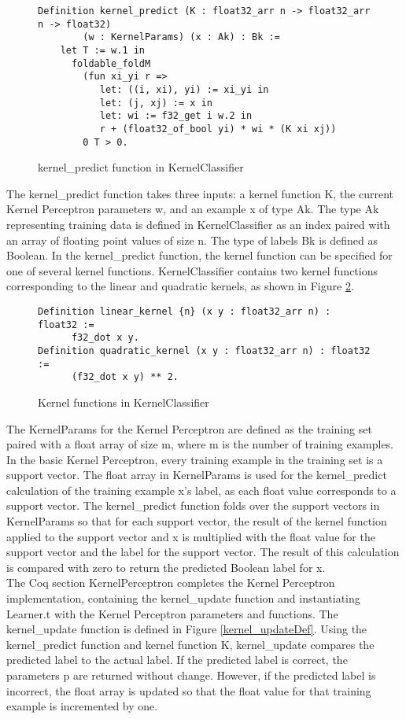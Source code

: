\begin{figure}
    \caption{kernel\_predict function in KernelClassifier}
    \label{kernel_predictDef}
    \begin{lstlisting}
Definition kernel_predict (K : float32_arr n -> float32_arr n -> float32) 
        (w : KernelParams) (x : Ak) : Bk :=
    let T := w.1 in 
      foldable_foldM
        (fun xi_yi r =>
           let: ((i, xi), yi) := xi_yi in
           let: (j, xj) := x in 
           let: wi := f32_get i w.2 in 
           r + (float32_of_bool yi) * wi * (K xi xj))
        0 T > 0.
    \end{lstlisting}
\end{figure}

The kernel\_predict function takes three inputs: a kernel function K, the current Kernel Perceptron parameters w, and an example x of type Ak. The type Ak representing training data is defined in KernelClassifier as an index paired with an array of floating point values of size n. The type of labels Bk is defined as Boolean. In the kernel\_predict function, the kernel function can be specified for one of several kernel functions. KernelClassifier contains two kernel functions corresponding to the linear and quadratic kernels, as shown in Figure \ref{kernelfunctionsDef}.

\begin{figure}
    \caption{Kernel functions in KernelClassifier}
    \label{kernelfunctionsDef}
    \begin{lstlisting}
Definition linear_kernel {n} (x y : float32_arr n) : float32 :=
      f32_dot x y.
Definition quadratic_kernel (x y : float32_arr n) : float32 :=
      (f32_dot x y) ** 2.
    \end{lstlisting}
\end{figure}

The KernelParams for the Kernel Perceptron are defined as the training set paired with a float array of size m, where m is the number of training examples. In the basic Kernel Perceptron, every training example in the training set is a support vector. The float array in KernelParams is used for the kernel\_predict calculation of the training example x's label, as each float value corresponds to a support vector. The kernel\_predict function folds over the support vectors in KernelParams so that for each support vector, the result of the kernel function applied to the support vector and x is multiplied with the float value for the support vector and the label for the support vector. The result of this calculation is compared with zero to return the predicted Boolean label for x. 
\\The Coq section KernelPerceptron completes the Kernel Perceptron implementation, containing the kernel\_update function and instantiating Learner.t with the Kernel Perceptron parameters and functions. The kernel\_update function is defined in Figure \ref{kernel_updateDef}. Using the kernel\_predict function and kernel function K, kernel\_update compares the predicted label to the actual label. If the predicted label is correct, the parameters p are returned without change. However, if the predicted label is incorrect, the float array is updated so that the float value for that training example is incremented by one. 

